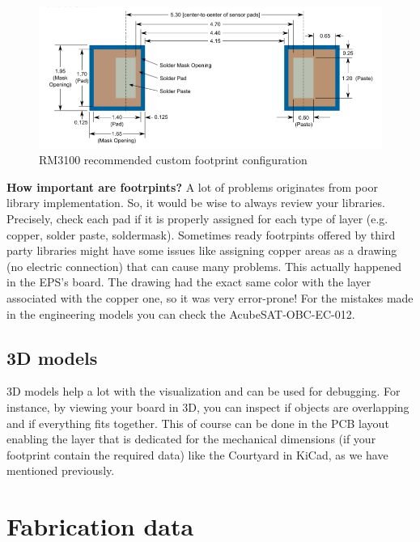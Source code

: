 \documentclass[final]{cubedoc}
\begin{document}
	\begin{figure}
		\centering
		\includegraphics[keepaspectratio, width = \textwidth]{assets/rm3100_foot.png}
		\caption{RM3100 recommended custom footprint configuration}
	\end{figure}
	
	
	
	\textbf{How important are footrpints?}
	A lot of problems originates from poor library implementation. So, it would be wise to always review your libraries. Precisely, check each pad if it is properly assigned for each type of layer (e.g. copper, solder paste, soldermask). Sometimes ready footrpints offered by third party libraries might have some issues like assigning copper areas as a drawing (no electric connection) that can cause many problems. This actually happened in the EPS's board. The drawing had the exact same color with the layer associated with the copper one, so it was very error-prone! For the mistakes made in the engineering models you can check the AcubeSAT-OBC-EC-012.
	
	
	\subsection{3D models}
	
	3D models help a lot with the visualization and can be used for debugging. For instance, by viewing your board in 3D, you can inspect if objects are overlapping and if everything fits together. This of course can be done in the PCB layout enabling the layer that is dedicated for the mechanical dimensions (if your footprint contain the required data) like the Courtyard in KiCad, as we have mentioned previously.
	
	\section{Fabrication data}
	
\end{document}
